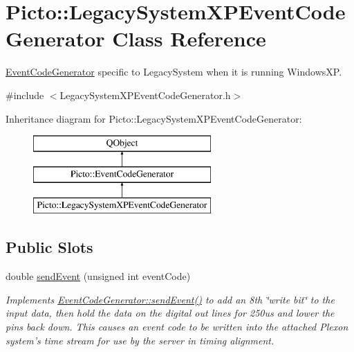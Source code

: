 \hypertarget{class_picto_1_1_legacy_system_x_p_event_code_generator}{\section{Picto\-:\-:Legacy\-System\-X\-P\-Event\-Code\-Generator Class Reference}
\label{class_picto_1_1_legacy_system_x_p_event_code_generator}
}


\hyperlink{class_picto_1_1_event_code_generator}{Event\-Code\-Generator} specific to Legacy\-System when it is running Windows\-X\-P.  




{\ttfamily \#include $<$Legacy\-System\-X\-P\-Event\-Code\-Generator.\-h$>$}

Inheritance diagram for Picto\-:\-:Legacy\-System\-X\-P\-Event\-Code\-Generator\-:\begin{figure}[H]
\begin{center}
\leavevmode
\includegraphics[height=3.000000cm]{class_picto_1_1_legacy_system_x_p_event_code_generator}
\end{center}
\end{figure}
\subsection*{Public Slots}
\begin{DoxyCompactItemize}
\item 
\hypertarget{class_picto_1_1_legacy_system_x_p_event_code_generator_a7fc61eed00f7245952125687f1896445}{double \hyperlink{class_picto_1_1_legacy_system_x_p_event_code_generator_a7fc61eed00f7245952125687f1896445}{send\-Event} (unsigned int event\-Code)}\label{class_picto_1_1_legacy_system_x_p_event_code_generator_a7fc61eed00f7245952125687f1896445}

\begin{DoxyCompactList}\small\item\em Implements \hyperlink{class_picto_1_1_event_code_generator_adf6a7d68b44bcecec9b7093c723cebb9}{Event\-Code\-Generator\-::send\-Event()} to add an 8th \char`\"{}write bit\char`\"{} to the input data, then hold the data on the digital out lines for 250us and lower the pins back down. This causes an event code to be written into the attached Plexon system's time stream for use by the server in timing alignment. \end{DoxyCompactList}\end{DoxyCompactItemize}
